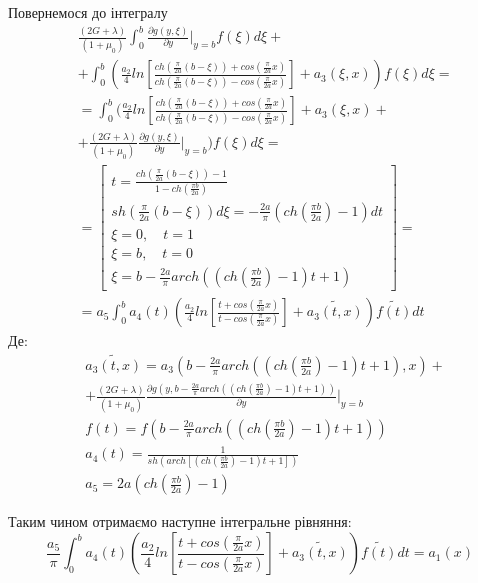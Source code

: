 Повернемося до інтегралу
\begin{align}
    &\frac{(2G + \lambda)}{(1+\mu_0)} \int_{0}^{b}\frac{\partial g(y, \xi)}{\partial y}|_{y=b} f(\xi) d\xi + \nonumber \\
    &+ \int_{0}^{b} \left( \frac{a_2}{4} ln\left[ \frac{ch(\frac{\pi}{2a}(b - \xi)) + cos(\frac{\pi}{2a}x)}{ch(\frac{\pi}{2a}(b - \xi)) - cos(\frac{\pi}{2a}x)} \right] + a_3(\xi, x) \right) f(\xi) d\xi = \nonumber \\
    &= \int_{0}^{b} ( \frac{a_2}{4} ln\left[ \frac{ch(\frac{\pi}{2a}(b - \xi)) + cos(\frac{\pi}{2a}x)}{ch(\frac{\pi}{2a}(b - \xi)) - cos(\frac{\pi}{2a}x)} \right] + a_3(\xi, x) + \nonumber \\ 
    &+ \frac{(2G + \lambda)}{(1+\mu_0)} \frac{\partial g(y, \xi)}{\partial y}|_{y=b} ) f(\xi) d\xi = \nonumber \\
    &= \left[
        \begin{matrix}
            t = \frac{ch(\frac{\pi}{2a}(b - \xi)) - 1}{1 - ch(\frac{\pi b}{2a})} \\
            sh(\frac{\pi}{2a}(b - \xi))d\xi = -\frac{2a}{\pi} (ch(\frac{\pi b}{2a}) - 1) dt \\
            \xi = 0, \quad t = 1 \\
            \xi = b, \quad t = 0 \\
            \xi = b - \frac{2a}{\pi} arch((ch(\frac{\pi b}{2a}) - 1)t + 1)
        \end{matrix}
        \right] = \nonumber \\
    &=a_5 \int_{0}^{b} a_4(t) \left( \frac{a_2}{4} ln\left[ \frac{t + cos(\frac{\pi}{2a}x)}{t - cos(\frac{\pi}{2a}x)} \right] + \widetilde{a_3(t, x)} \right) \widetilde{f(t)} dt
\end{align}
Де:
\begin{align*}
    &\widetilde{a_3(t, x)} = a_3\left(b - \frac{2a}{\pi} arch((ch(\frac{\pi b}{2a}) - 1)t + 1), x \right) + \\
    &+ \frac{(2G + \lambda)}{(1+\mu_0)} \frac{\partial g(y, b - \frac{2a}{\pi} arch((ch(\frac{\pi b}{2a}) - 1)t + 1))}{\partial y}|_{y=b} \\
    &f(t) = f(b - \frac{2a}{\pi} arch((ch(\frac{\pi b}{2a}) - 1)t + 1)) \\
    &a_4(t) = \frac{1}{ sh\left(arch\left[ (ch(\frac{\pi b}{2a}) - 1)t + 1 \right]\right) } \\
    &a_5 = 2a (ch(\frac{\pi b}{2a}) - 1)
\end{align*}

Таким чином отримаємо наступне інтегральне рівняння:
\begin{equation}
    \frac{a_5}{\pi} \int_{0}^{b} a_4(t) \left( \frac{a_2}{4} ln\left[ \frac{t + cos(\frac{\pi}{2a}x)}{t - cos(\frac{\pi}{2a}x)} \right] + \widetilde{a_3(t, x)} \right) \widetilde{f(t)} dt = a_1(x)
\end{equation}

